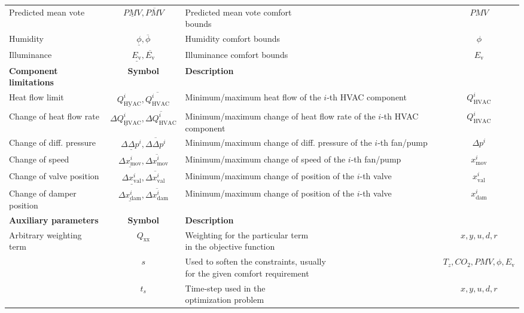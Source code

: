 \documentclass[10pt]{extarticle}
\begin{document}
\begin{table}[h]
\begin{tabular}{l|c|l|c}
		Predicted mean vote & $\underline{PMV},\overline{PMV}$ &  \makecell[l]{Predicted mean vote comfort \\ bounds} & $PMV$ \\
		Humidity & $\underline{\phi},\overline{\phi}$ &  Humidity comfort bounds & $\phi$  \\
		Illuminance & $\underline{E_{\text{v}}},\overline{E_{\text{v}}}$ & Illuminance comfort bounds & $E_{\text{v}}$  \\
		\bottomrule 
		\textbf{Component limitations}  & \textbf{Symbol} &  \textbf{Description} \\
		\midrule
		Heat flow limit & $\underline{Q^i_{\text{HVAC}}},\overline{Q^i_{\text{HVAC}}}$ & \makecell[l]{Minimum/maximum heat flow of \\ the $i$-th HVAC component} & $Q^i_{\text{HVAC}}$ \\
		Change of heat flow rate & $\underline{\Delta Q^i_{\text{HVAC}}},\overline{\Delta Q^i_{\text{HVAC}}}$ & \makecell[l]{Minimum/maximum change of \\ heat flow rate of the  $i$-th HVAC component} & $Q^i_{\text{HVAC}}$ \\
		Change of diff. pressure & $\underline{\Delta\Delta p^i},\overline{\Delta\Delta p^i}$ & \makecell[l]{Minimum/maximum change of \\ diff. pressure of the  $i$-th fan/pump} & $\Delta p^i$ \\
		Change of speed & $\underline{\Delta x^i_{\text{mov}}},\overline{\Delta x^i_{\text{mov}}}$ & \makecell[l]{Minimum/maximum change of \\ speed of the  $i$-th fan/pump} & $x^i_{\text{mov}}$ \\
		Change of valve position & $\underline{\Delta x^i_{\text{val}}},\overline{\Delta x^i_{\text{val}}}$ & \makecell[l]{Minimum/maximum change of \\ position of the  $i$-th valve} & $x^i_{\text{val}}$ \\
		Change of damper position & $\underline{\Delta x^i_{\text{dam}}},\overline{\Delta x^i_{\text{dam}}}$ & \makecell[l]{Minimum/maximum change of \\ position of the  $i$-th valve} & $x^i_{\text{dam}}$ \\
		\midrule
		\textbf{Auxiliary parameters}  & \textbf{Symbol} &  \textbf{Description} \\
		\midrule
		\makecell[l]{Arbitrary weighting \\ term} & $Q_{\text{xx}}$ &  \makecell[l]{Weighting for the particular term \\ in the objective function} & $x,y,u,d,r$ \\
		\makecell[l]{Slack variable} & $s$ &  \makecell[l]{Used to soften the constraints, usually \\ for the given comfort requirement} 
		&  $T_{z}, CO_{2}, PMV, \phi, E_{\text{v}}$\\
		\makecell[l]{Time-step} & $t_s$ &  \makecell[l]{Time-step used in the \\ optimization problem} & $x,y,u,d,r$  \\
		\bottomrule 
	\end{tabular}
\end{table}
\end{document}
